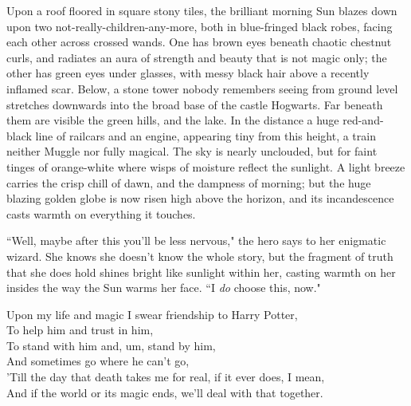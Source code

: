 \later

Upon a roof floored in square stony tiles, the brilliant morning Sun blazes down upon two not-really-children-any-more, both in blue-fringed black robes, facing each other across crossed wands. One has brown eyes beneath chaotic chestnut curls, and radiates an aura of strength and beauty that is not magic only; the other has green eyes under glasses, with messy black hair above a recently inflamed scar. Below, a stone tower nobody remembers seeing from ground level stretches downwards into the broad base of the castle Hogwarts. Far beneath them are visible the green hills, and the lake. In the distance a huge red-and-black line of railcars and an engine, appearing tiny from this height, a train neither Muggle nor fully magical. The sky is nearly unclouded, but for faint tinges of orange-white where wisps of moisture reflect the sunlight. A light breeze carries the crisp chill of dawn, and the dampness of morning; but the huge blazing golden globe is now risen high above the horizon, and its incandescence casts warmth on everything it touches.

``Well, maybe after this you'll be less nervous," the hero says to her enigmatic wizard. She knows she doesn't know the whole story, but the fragment of truth that she does hold shines bright like sunlight within her, casting warmth on her insides the way the Sun warms her face. ``I \emph{do} choose this, now."

\begin{em}
\noindent{}Upon my life and magic I swear friendship to Harry Potter,\\
To help him and trust in him,\\
To stand with him and, um, stand by him,\\
And sometimes go where he can't go,\\
'Till the day that death takes me for real, if it ever does, I mean,\\
And if the world or its magic ends, we'll deal with that together.
\end{em}

